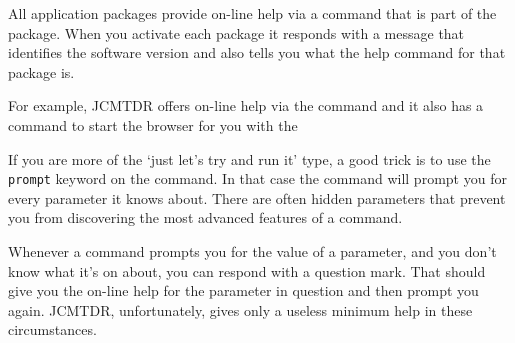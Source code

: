 \documentclass[11pt,noabs]{starlink}
\begin{document}
   All application packages provide on-line help via a command that is
   part of the package. When you activate each package
   it responds with a message that identifies the software version and
   also tells you what the help command for that package is.

   For example, JCMTDR offers on-line help via the command
\texttt{}
   and it also has a command
\texttt{}
   to start the
   browser for you with the

   If you are more of the `just let's try and run it' type, a good trick
   is to use the \texttt{prompt} keyword on the command. In that case
   the command will prompt you for every parameter it knows about. There
   are often hidden parameters that prevent you from discovering the
   most advanced features of a command.

   Whenever a command prompts you for the value of a parameter, and you
   don't know what it's on about, you can respond with a question mark.
   That should give you the on-line help for the parameter in question
   and then prompt you again. JCMTDR, unfortunately, gives only a
   useless minimum help in these circumstances.
\end{document}
